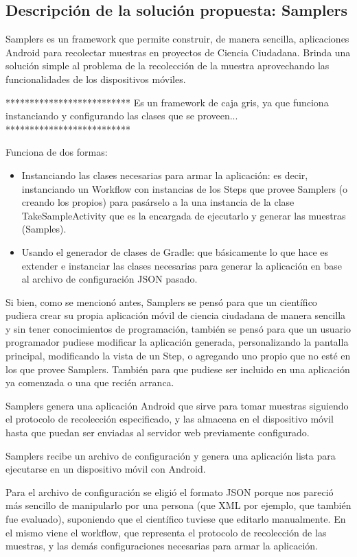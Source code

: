 \subsection{Descripción de la solución propuesta: Samplers}
Samplers es un framework que permite construir, de manera sencilla, aplicaciones Android para recolectar muestras en proyectos de Ciencia Ciudadana. Brinda una solución simple al problema de la recolección de la muestra aprovechando las funcionalidades de los dispositivos móviles.

**************************
Es un framework de caja gris, ya que funciona instanciando y configurando las clases que se proveen... 
**************************

Funciona de dos formas:
\begin{itemize}
\item Instanciando las clases necesarias para armar la aplicación: es decir, instanciando un Workflow con instancias de los Steps que provee Samplers (o creando los propios) para pasárselo a la una instancia de la clase TakeSampleActivity que es la encargada de ejecutarlo y generar las muestras (Samples).
\item Usando el generador de clases de Gradle: que básicamente lo que hace es extender e instanciar las clases necesarias para generar la aplicación en base al archivo de configuración JSON pasado. 
\end{itemize}



Si bien, como se mencionó antes, Samplers se pensó para que un científico pudiera crear su propia aplicación móvil de ciencia ciudadana de manera sencilla y sin tener conocimientos de programación, también se pensó para que un usuario programador pudiese modificar la aplicación generada, personalizando la pantalla principal, modificando la vista de un Step, o agregando uno propio que no esté en los que provee Samplers. También para que pudiese ser incluido en una aplicación ya comenzada o una que recién arranca.


Samplers genera una aplicación Android que sirve para tomar muestras siguiendo el protocolo de recolección especificado, y las almacena en el dispositivo móvil hasta que puedan ser enviadas al servidor web previamente configurado. 

Samplers recibe un archivo de configuración y genera una aplicación lista para ejecutarse en un dispositivo móvil con Android.

Para el archivo de configuración se eligió el formato JSON porque nos pareció más sencillo de manipularlo por una persona (que XML por ejemplo, que también fue evaluado), suponiendo que el científico tuviese que editarlo manualmente. En el mismo viene el workflow, que representa el protocolo de recolección de las muestras, y las demás configuraciones necesarias para armar la aplicación.


